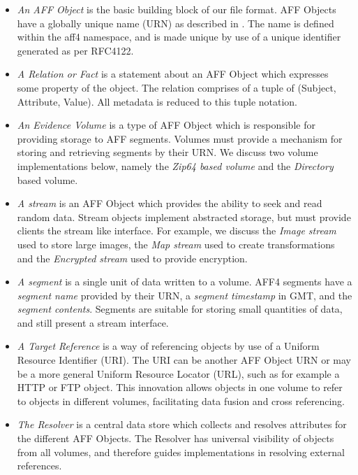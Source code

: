 \documentclass[10pt, conference]{IEEEtran}
\begin{document}
\begin{itemize}
\item \emph{An AFF Object} is the basic building block of our
  file format. AFF Objects have a globally unique name (URN) as
  described in \cite{RFC1737}. The name is defined within the aff4
  namespace, and is made unique by use of a unique identifier
  generated as per RFC4122\cite{RFC4122}.

\item \emph{A Relation or Fact} is a statement about an AFF Object which
  expresses some property of the object. The relation comprises of a
  tuple of (Subject, Attribute, Value). All metadata is reduced to
  this tuple notation.

\item \emph{An Evidence Volume} is a type of AFF Object which is
responsible for providing storage to AFF segments. Volumes must
provide a mechanism for storing and retrieving segments by their
URN. We discuss two volume implementations below, namely the {\em
Zip64 based volume} and the {\em Directory} based volume.

\label{definitions}
\item \emph{A stream} is an AFF Object which provides the ability to
  seek and read random data. Stream objects implement abstracted
  storage, but must provide clients the stream like interface. For
  example, we discuss the {\em Image stream} used to store large
  images, the {\em Map stream} used to create transformations and the
  {\em Encrypted stream} used to provide encryption.

\item \emph{A segment} is a single unit of data written to a volume. AFF4
  segments have a \emph{segment name} provided by their URN, a
  \emph{segment timestamp} in GMT, and the \emph{segment
  contents}. Segments are suitable for storing small quantities of
  data, and still present a stream interface.

\item \emph{A Target Reference} is a way of referencing objects by use
  of a Uniform Resource Identifier (URI). The URI can be another AFF
  Object URN or may be a more general Uniform Resource Locator (URL),
  such as for example a HTTP or FTP object. This innovation allows
  objects in one volume to refer to objects in different volumes,
  facilitating data fusion and cross referencing.

\item \emph{The Resolver} is a central data store which collects and resolves
  attributes for the different AFF Objects. The Resolver has universal
  visibility of objects from all volumes, and therefore guides
  implementations in resolving external references.
\end{itemize}
\end{document}
